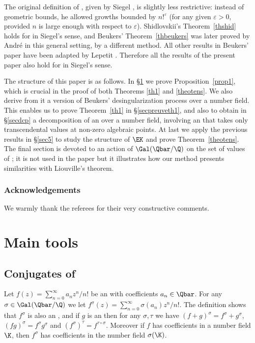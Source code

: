 The original definition of \Efunctions, given by Siegel \cite{siegel}, is slightly less restrictive:
instead of geometric bounds,
he allowed growths bounded by $n!^{\varepsilon}$ (for any given $\varepsilon>0$, provided $n$ is large enough with respect to $\varepsilon$).
Shidlovskii's Theorem~\ref{thshid} holds for \Efunctions in Siegel's sense, and
Beukers' Theorem~\ref{thbeukers} was later proved by André \cite{andreasens} in this general setting, by a different method. All other results in Beukers' paper \cite{beukers} have been adapted by Lepetit \cite{lepetit}. Therefore all the results of the present paper also hold for \Efunctions in Siegel's sense.

The structure of this paper is as follows. In \S \ref{sec2} we prove Proposition~\ref{prop1},
which is crucial in the proof of both Theorems \ref{th1} and \ref{theotens}. We also derive from it
a version of Beukers' desingularization process over a number field. This enables us to prove Theorem~\ref{th1} in \S \ref{secpreuveth1}, and also to obtain in \S \ref{secdcp} a decomposition of an \Efunction over a number field, involving an \Efunction that takes only transcendental values at non-zero algebraic points. At last we apply the previous results in \S \ref{sec5} to study the structure of $\EK$ and prove Theorem~\ref{theotens}.
The final section is devoted to an action of $\Gal(\Qbar/\Q)$ on the set of values of \Efunctions; it is not used in the paper but it illustrates how our method presents similarities with Liouville's theorem.

\subsubsection*{Acknowledgements}
We warmly thank the referees for their very constructive comments.

\section{Main tools}\label{sec2}

\subsection{Conjugates of \Efunctions} \label{ssec:conjugates}

Let $f(z) = \sum_{n=0}^\infty a_n z^n/n!$ be an \Efunction with coefficients $a_n\in\Qbar$. For any $\sigma \in\Gal(\Qbar/\Q)$ we let $f^\sigma(z) = \sum_{n=0}^\infty \sigma(a_n) z^n/n!$. The definition shows that $f^\sigma$ is also an \Efunction, and if $g$ is an \Efunction then for any $\sigma ,\tau$ we have
$(f+g)^\sigma = f^\sigma+g^\sigma$, $ (f g)^\sigma = f^\sigma g^\sigma$ and $(f^\sigma )^\tau = f^{\tau\circ\sigma}$. Moreover if $f$ has coefficients in a number field $\K$, then $f^\sigma$ has coefficients in the number field $\sigma(\K)$.

